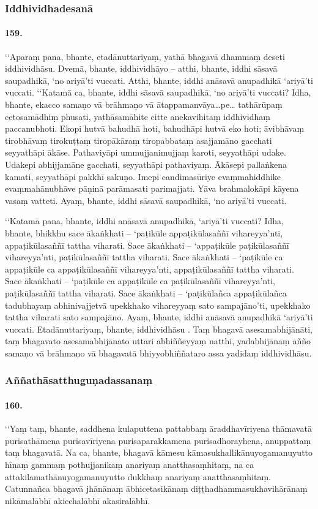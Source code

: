 \subsubsection{Iddhividhadesanā}

\paragraph{159.} ‘‘Aparaṃ pana, bhante, etadānuttariyaṃ, yathā bhagavā dhammaṃ deseti iddhividhāsu. Dvemā, bhante, iddhividhāyo – atthi, bhante, iddhi sāsavā saupadhikā, ‘no ariyā’ti vuccati. Atthi, bhante, iddhi anāsavā anupadhikā ‘ariyā’ti vuccati. ‘‘Katamā ca, bhante, iddhi sāsavā saupadhikā, ‘no ariyā’ti vuccati? Idha, bhante, ekacco samaṇo vā brāhmaṇo vā ātappamanvāya…pe… tathārūpaṃ cetosamādhiṃ phusati, yathāsamāhite citte anekavihitaṃ iddhividhaṃ paccanubhoti. Ekopi hutvā bahudhā hoti, bahudhāpi hutvā eko hoti; āvibhāvaṃ tirobhāvaṃ tirokuṭṭaṃ tiropākāraṃ tiropabbataṃ asajjamāno gacchati seyyathāpi ākāse. Pathaviyāpi ummujjanimujjaṃ karoti, seyyathāpi udake. Udakepi abhijjamāne gacchati, seyyathāpi pathaviyaṃ. Ākāsepi pallaṅkena kamati, seyyathāpi pakkhī sakuṇo. Imepi candimasūriye evaṃmahiddhike evaṃmahānubhāve pāṇinā parāmasati parimajjati. Yāva brahmalokāpi kāyena vasaṃ vatteti. Ayaṃ, bhante, iddhi sāsavā saupadhikā, ‘no ariyā’ti vuccati.

‘‘Katamā pana, bhante, iddhi anāsavā anupadhikā, ‘ariyā’ti vuccati? Idha, bhante, bhikkhu sace ākaṅkhati – ‘paṭikūle appaṭikūlasaññī vihareyya’nti, appaṭikūlasaññī tattha viharati. Sace ākaṅkhati – ‘appaṭikūle paṭikūlasaññī vihareyya’nti, paṭikūlasaññī tattha viharati. Sace ākaṅkhati – ‘paṭikūle ca appaṭikūle ca appaṭikūlasaññī vihareyya’nti, appaṭikūlasaññī tattha viharati. Sace ākaṅkhati – ‘paṭikūle ca appaṭikūle ca paṭikūlasaññī vihareyya’nti, paṭikūlasaññī tattha viharati. Sace ākaṅkhati – ‘paṭikūlañca appaṭikūlañca tadubhayaṃ abhinivajjetvā upekkhako vihareyyaṃ sato sampajāno’ti, upekkhako tattha viharati sato sampajāno. Ayaṃ, bhante, iddhi anāsavā anupadhikā ‘ariyā’ti vuccati. Etadānuttariyaṃ, bhante, iddhividhāsu . Taṃ bhagavā asesamabhijānāti, taṃ bhagavato asesamabhijānato uttari abhiññeyyaṃ natthi, yadabhijānaṃ añño samaṇo vā brāhmaṇo vā bhagavatā bhiyyobhiññataro assa yadidaṃ iddhividhāsu.

\subsubsection{Aññathāsatthuguṇadassanaṃ}

\paragraph{160.} ‘‘Yaṃ taṃ, bhante, saddhena kulaputtena pattabbaṃ āraddhavīriyena thāmavatā purisathāmena purisavīriyena purisaparakkamena purisadhorayhena, anuppattaṃ taṃ bhagavatā. Na ca, bhante, bhagavā kāmesu kāmasukhallikānuyogamanuyutto hīnaṃ gammaṃ pothujjanikaṃ anariyaṃ anatthasaṃhitaṃ, na ca attakilamathānuyogamanuyutto dukkhaṃ anariyaṃ anatthasaṃhitaṃ. Catunnañca bhagavā jhānānaṃ ābhicetasikānaṃ diṭṭhadhammasukhavihārānaṃ nikāmalābhī akicchalābhī akasiralābhī.

